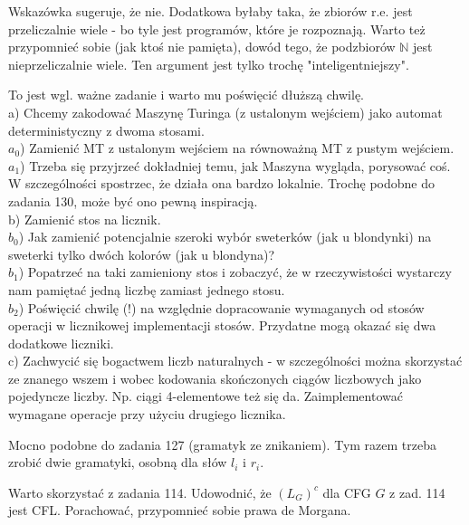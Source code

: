 \documentclass[a4paper,11pt]{article}
\newenvironment{zadanie}[1]
  {\renewcommand\theinnercustomthm{#1}\innercustomthm}
  {\endinnercustomthm}
\begin{document}
\begin{zadanie}{107}
Wskazówka sugeruje, że nie. Dodatkowa byłaby taka, że zbiorów r.e. jest przeliczalnie wiele - bo tyle jest programów, które je
rozpoznają. Warto też przypomnieć sobie (jak ktoś nie pamięta), dowód tego, że podzbiorów $\mathbb{N}$ jest nieprzeliczalnie
wiele. Ten argument jest tylko trochę "inteligentniejszy".
\end{zadanie}

\begin{zadanie}{110}
To jest wgl. ważne zadanie i warto mu poświęcić dłuższą chwilę. \\
a) Chcemy zakodować Maszynę Turinga (z ustalonym wejściem) jako automat deterministyczny z dwoma stosami. \\
$a_0$) Zamienić MT z ustalonym wejściem na równoważną MT z pustym wejściem. \\
$a_1$) Trzeba się przyjrzeć dokładniej temu,
jak Maszyna wygląda, porysować coś. W szczególności spostrzec, że działa ona bardzo lokalnie. Trochę podobne do zadania 
130, może być ono pewną inspiracją. \\
b) Zamienić stos na licznik. \\
$b_0$) Jak zamienić potencjalnie szeroki wybór sweterków (jak u blondynki) na sweterki tylko dwóch kolorów (jak u blondyna)? \\
$b_1$) Popatrzeć na taki zamieniony stos i zobaczyć, że w rzeczywistości wystarczy nam pamiętać jedną liczbę zamiast jednego 
stosu. \\
$b_2$) Poświęcić chwilę (!) na względnie dopracowanie wymaganych od stosów operacji w licznikowej implementacji stosów. 
Przydatne mogą okazać się dwa dodatkowe liczniki. \\
c) Zachwycić się bogactwem liczb naturalnych - w szczególności można skorzystać ze znanego wszem i wobec kodowania
skończonych ciągów liczbowych jako pojedyncze liczby. Np. ciągi 4-elementowe też się da. Zaimplementować wymagane
operacje przy użyciu drugiego licznika.
\end{zadanie}

\begin{zadanie}{114}
Mocno podobne do zadania 127 (gramatyk ze znikaniem). Tym razem trzeba zrobić dwie gramatyki, osobną dla słów $l_i$ i $r_i$.
\end{zadanie}

\begin{zadanie}{115}
Warto skorzystać z zadania 114. Udowodnić, że $(L_G)^c$ dla CFG $G$ z zad. 114 jest CFL. Porachować, przypomnieć sobie prawa
de Morgana.
\end{zadanie}
\end{document}
